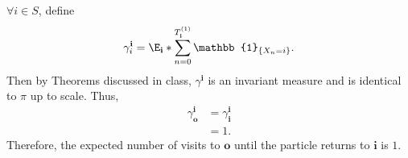 \documentclass[
  coursecode={MTHE 455},
  assignmentname={Assignment \assignmentnumber},
  studentnumber=20053722,
  name={Bryan Hoang},
  draft,
]{
  ltxanswer%
}
\begin{document}
\begin{questions}
\begin{parts}
      \part{}
      \begin{solution}
        \(\forall i \in S\), define
        \begin{equation*}
          \gamma_{i}^{\mathbf{i}} = \E_{\mathbf{i}}*{\sum_{n=0}^{T_{\mathbf{i}}^{(1)}} \mathbb{1}_{\{X_{n}=i\}}}.
        \end{equation*}
        Then by Theorems discussed in class, \(\gamma^{\mathbf{i}}\) is an invariant measure and is identical to \(\pi\) up to scale. Thus,
        \begin{align*}
          \gamma_{\mathbf{o}}^{\mathbf{i}} &= \gamma_{\mathbf{i}}^{\mathbf{i}} \\
                                           &= 1.
        \end{align*}
        Therefore, the expected number of visits to \(\mathbf{o}\) until the particle returns to \(\mathbf{i}\) is \(\boxed{1}\).
      \end{solution}
    \end{parts}
  \end{questions}
\end{document}
